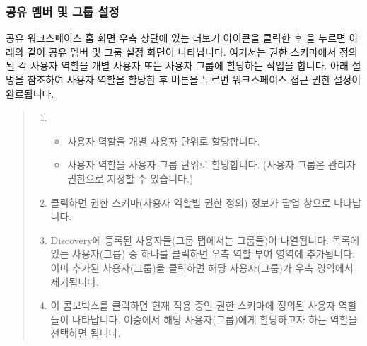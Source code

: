 \documentclass[letterpaper,10pt,english]{sphinxmanual}
\begin{document}
\subsubsection{공유 멤버 및 그룹 설정}
\label{\detokenize{discovery/part03/shared_workspace:shared-members-setup}}\label{\detokenize{discovery/part03/shared_workspace:id8}}
공유 워크스페이스 홈 화면 우측 상단에 있는 더보기 아이콘을 클릭한 후 을 누르면 아래와 같이 공유 멤버 및 그룹 설정 화면이 나타납니다. 여기서는 권한 스키마에서 정의된 각 사용자 역할을 개별 사용자 또는 사용자 그룹에 할당하는 작업을 합니다. 아래 설명을 참조하여 사용자 역할을 할당한 후  버튼을 누르면 워크스페이스 접근 권한 설정이 완료됩니다.
\begin{quote}

\begin{figure}[H]
\centering

\noindent{}
\end{figure}
\begin{enumerate}
\def\theenumi{\arabic{enumi}}
\def\labelenumi{\theenumi .}
\makeatletter\def\p@enumii{\p@enumi \theenumi .}\makeatother
\item {} 
\begin{itemize}
\item {} 
 사용자 역할을 개별 사용자 단위로 할당합니다.

\item {} 
 사용자 역할을 사용자 그룹 단위로 할당합니다. (사용자 그룹은 관리자 권한으로 지정할 수 있습니다.)

\end{itemize}

\item {} 
 클릭하면 권한 스키마(사용자 역할별 권한 정의) 정보가 팝업 창으로 나타납니다.

\item {} 
 Discovery에 등록된 사용자들(그룹 탭에서는 그룹들)이 나열됩니다. 목록에 있는 사용자(그룹) 중 하나를 클릭하면 우측 역할 부여 영역에 추가됩니다. 이미 추가된 사용자(그룹)을 클릭하면 해당 사용자(그룹)가 우측 영역에서 제거됩니다.

\item {} 
 이 콤보박스를 클릭하면 현재 적용 중인 권한 스키마에 정의된 사용자 역할들이 나타납니다. 이중에서 해당 사용자(그룹)에게 할당하고자 하는 역할을 선택하면 됩니다.

\end{enumerate}
\end{quote}
\end{document}
